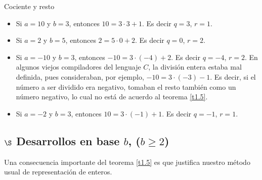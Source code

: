 \begin{section}{Cociente y resto}
\begin{ejemplo} {} 

\begin{itemize}
\item Si $a=10$ y $b=3$, entonces $10 = 3 \cdot 3 +1$. Es decir $q= 3$, $r=1$. 
\item Si $a=2$ y $b=5$, entonces $2 = 5 \cdot 0 +2$. Es decir $q= 0$, $r=2$. 
\item Si $a=-10$ y $b=3$, entonces $-10 = 3 \cdot (-4) +2$. Es decir $q= -4$, $r=2$. En algunos viejos compiladores del lenguaje $C$, la división entera estaba mal definida, pues consideraban, por ejemplo, $-10 = 3 \cdot (-3) -1$. Es decir, si el número a ser dividido era negativo, tomaban el resto también como un número negativo, lo cual no está de acuerdo al teorema \ref{t1.5}.  
\item Si $a=-2$ y $b=3$, entonces $10 = 3 \cdot (-1) +1$. Es decir $q= -1$, $r=1$. 
\end{itemize}
\end{ejemplo}




\subsection*{\Large $\S$ Desarrollos en base $b$, ($b \ge 2$)}
	
	
Una consecuencia importante del teorema \ref{t1.5} es que
justifica nuestro método usual de representación de enteros. 


\end{section}
